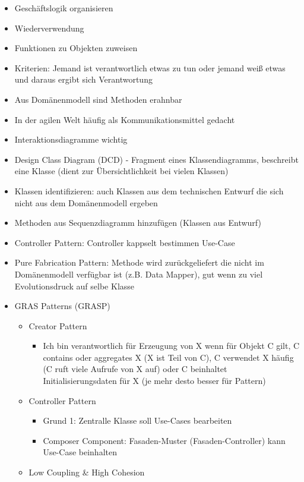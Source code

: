 \documentclass[paper=a4, fontsize=11pt]{scrartcl} %
\numberwithin{equation}{section} %
\numberwithin{figure}{section} %
\numberwithin{table}{section} %
\begin{document}
\begin{itemize}
  \item Geschäftslogik organisieren
  \item Wiederverwendung
  \item Funktionen zu Objekten zuweisen
  \item Kriterien: Jemand ist verantwortlich etwas zu tun oder jemand weiß etwas und daraus ergibt sich Verantwortung
  \item Aus Domänenmodell sind Methoden erahnbar
  \item In der agilen Welt häufig als Kommunikationsmittel gedacht
  \item Interaktionsdiagramme wichtig
  \item Design Class Diagram (DCD) - Fragment eines Klassendiagramms, beschreibt eine Klasse (dient zur Übersichtlichkeit bei vielen Klassen)
  \item Klassen identifizieren: auch Klassen aus dem technischen Entwurf die sich nicht aus dem Domänenmodell ergeben
  \item Methoden aus Sequenzdiagramm hinzufügen (Klassen aus Entwurf)
  \item Controller Pattern: Controller kappselt bestimmen Use-Case
  \item Pure Fabrication Pattern: Methode wird zurückgeliefert die nicht im Domänenmodell verfügbar ist (z.B. Data Mapper), gut wenn zu viel Evolutionsdruck auf selbe Klasse
  \item GRAS Patterns (GRASP)
  \begin{itemize}
    \item Creator Pattern
    \begin{itemize}
      \item Ich bin verantwortlich für Erzeugung von X wenn für Objekt C gilt, C contains oder aggregates X (X ist Teil von C), C verwendet X häufig (C ruft viele Aufrufe von X auf) oder C beinhaltet Initialisierungsdaten für X (je mehr desto besser für Pattern)
    \end{itemize}
    \item Controller Pattern
    \begin{itemize}
      \item Grund 1: Zentralle Klasse soll Use-Cases bearbeiten
      \item Composer Component: Fasaden-Muster (Fasaden-Controller) kann Use-Case beinhalten
    \end{itemize}
    \item Low Coupling \& High Cohesion\\

\end{itemize}
\end{itemize}
\end{document}
